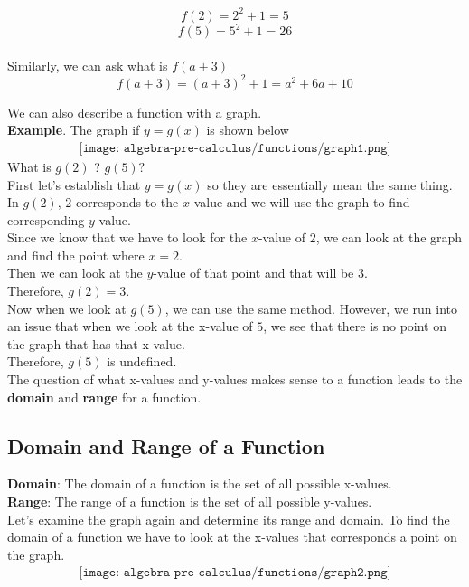 $$f(2) = 2^2 + 1 = 5$$
$$f(5) = 5^2 + 1 = 26$$ \\

Similarly, we can ask what is $f(a + 3)$
$$ f(a + 3) = (a+3)^2 + 1 = a^2 + 6a + 10 $$
\vspace{4pt}

We can also describe a function with a graph. \\
\textbf{Example}. The graph if $y = g(x)$ is shown below
\begin{align*}
	\texttt{[image: algebra-pre-calculus/functions/graph1.png]}
\end{align*}
\vspace{1pt}
What is $g(2)$ ? $ g(5) ?$ \\

First let's establish that $ y = g(x) $ so they are essentially mean the same thing. \\
In $g(2)$, $2$ corresponds to the $x$-value and we will use the graph to find corresponding $y$-value. \\
Since we know that we have to look for the $x$-value of $2$, we can look at the graph and find the point where $x = 2$. \\
Then we can look at the $y$-value of that point and that will be $3$. \\
Therefore, $g(2) = 3$. \\
Now when we look at $g(5)$, we can use the same method. However, we run into an issue that when we look at the x-value of $5$, we see that there is no point on the graph that has that x-value. \\
Therefore, $g(5)$ is undefined. \\
The question of what x-values and y-values makes sense to a function leads to the \textbf{domain} and \textbf{range} for a function. \\

\subsection{Domain and Range of a Function}
\textbf{Domain}: The domain of a function is the set of all possible x-values. \\
\textbf{Range}: The range of a function is the set of all possible y-values. \\

Let's examine the graph again and determine its range and domain. To find the domain of a function we have to look at the x-values that corresponds a point on the graph. \\
\begin{align*}
	\texttt{[image: algebra-pre-calculus/functions/graph2.png]}
\end{align*}

